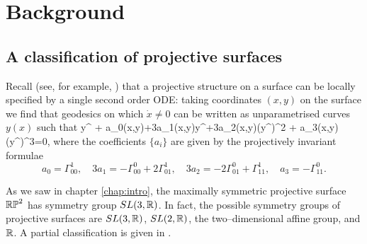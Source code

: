 \section{Background}
\label{sec:background}

\subsection{A classification of projective surfaces}
Recall (see, for example, \cite{BDE}) that a projective structure on a surface can be locally specified by a single second order ODE: taking coordinates $(x,y)$ on the surface we find that geodesics on which $\dot{x}\neq 0$ can be written as unparametrised curves $y(x)$ such that
\be
\label{odealice}
y^{\prime \prime} + a_0(x,y)+3a_1(x,y)y^{\prime}+3a_2(x,y)(y^{\prime})^2 + a_3(x,y)(y^\prime)^3=0,
\ee
where the coefficients $\{a_i\}$ are given by the projectively invariant formulae
\[
a_0=\Gamma^1_{00},\quad
3a_1=-\Gamma^0_{00}+2\Gamma^1_{01},\quad
3a_2=-2\Gamma^0_{01}+\Gamma^1_{11},\quad
a_3=-\Gamma^0_{11}.
\]

As we saw in chapter \ref{chap:intro}, the maximally symmetric projective surface $\mathbb{RP}^2$ has symmetry group $SL(3,\mathbb{R})$. In fact, the possible symmetry groups of projective surfaces are $SL(3, \mathbb{R})$, $SL(2,\mathbb{R})$, the two--dimensional affine group, and $\mathbb{R}$. A partial classification is given in \cite{Bryant}.

